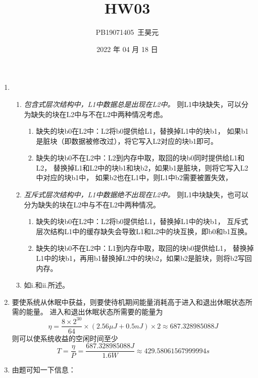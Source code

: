 \documentclass{article}
\title{HW03}
\author{PB19071405\ 王昊元}
\date{2022 年 04 月 18 日}
\begin{document}
    \maketitle

    \begin{enumerate}[label=\arabic*.]
        \item \begin{enumerate}[label=\alph*.]
            \item \emph{包含式层次结构中，L1中数据总是出现在L2中。}
            则L1中块缺失，可以分为缺失的块在L2中与不在L2中两种情况考虑。
            \begin{enumerate}[label=\roman*.]
                \item 缺失的块b0在L2中：L2将b0提供给L1，替换掉L1中的块b1，
                如果b1是脏块（即数据被修改过），将它写入L2对应的块b1即可。
                \item 缺失的块b0不在L2中：L2到内存中取，取回的块b0同时提供给L1和L2，
                替换掉L1和L2中的块b1和块b2，如果b1是脏块，则将它写入L2中对应的块b1中，
                如果b2也在L1中，则L1中b2需要被置失效，
            \end{enumerate}
            \item \emph{互斥式层次结构中，L1中数据绝不出现在L2中。}
            则L1中块缺失，也可以分为缺失的块在L2中与不在L2中两种情况。
            \begin{enumerate}[label=\roman*.]
                \item 缺失的块b0在L2中：L2将b0提供给L1，替换掉L1中的块b1，
                互斥式层次结构L1中的缓存缺失会导致L1和L2中的块互换，即b0和b1互换。
                \item 缺失的块b0不在L2中：L1到内存中取，取回的块b0提供给L1，
                替换掉L1中的块b1，再用b1替换掉L2中的块b2，如果b2是脏块，则将b2写回内存。
            \end{enumerate}
            \item 如i.和ii.所述。
        \end{enumerate}
        \item 要使系统从休眠中获益，则要使待机期间能量消耗高于进入和退出休眠状态所需的能量。
        进入和退出休眠状态所需要的能量为
        $$\eta = \frac{8\times2^{30}}{64}\times(2.56\mu J + 0.5nJ)\times2 \approx 687.328985088 J $$
        则可以使系统收益的空闲时间至少
        $$T = \frac{\eta}{P} = \frac{687.328985088 J}{1.6W} \approx 429.58061567999994s$$
        \item 由题可知一下信息：
        \begin{itemize}

\end{itemize}
\end{enumerate}
\end{document}
